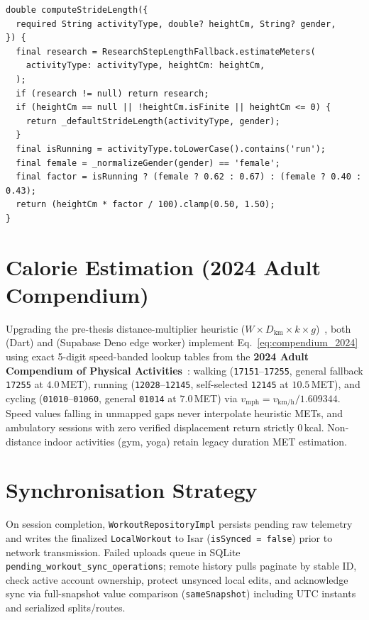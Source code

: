 \begin{lstlisting}[caption={Adaptive stride-length dispatch with height-based fallback in \texttt{record\_providers.dart}.},label={lst:stride_length}]
double computeStrideLength({
  required String activityType, double? heightCm, String? gender,
}) {
  final research = ResearchStepLengthFallback.estimateMeters(
    activityType: activityType, heightCm: heightCm,
  );
  if (research != null) return research;
  if (heightCm == null || !heightCm.isFinite || heightCm <= 0) {
    return _defaultStrideLength(activityType, gender);
  }
  final isRunning = activityType.toLowerCase().contains('run');
  final female = _normalizeGender(gender) == 'female';
  final factor = isRunning ? (female ? 0.62 : 0.67) : (female ? 0.40 : 0.43);
  return (heightCm * factor / 100).clamp(0.50, 1.50);
}
\end{lstlisting}

\section{Calorie Estimation (2024 Adult Compendium)}
Upgrading the pre-thesis distance-multiplier heuristic ($W \times D_{\text{km}} \times k \times g$)~\cite{aetron2026prethesis}, both  (Dart) and  (Supabase Deno edge worker) implement Eq.~\ref{eq:compendium_2024} using exact 5-digit speed-banded lookup tables from the \textbf{2024 Adult Compendium of Physical Activities}~\cite{herrmann2024compendium}: walking (\texttt{17151}--\texttt{17255}, general fallback \texttt{17255} at $4.0$\,MET), running (\texttt{12028}--\texttt{12145}, self-selected \texttt{12145} at $10.5$\,MET), and cycling (\texttt{01010}--\texttt{01060}, general \texttt{01014} at $7.0$\,MET) via $v_{\text{mph}} = v_{\text{km/h}}/1.609344$. Speed values falling in unmapped gaps never interpolate heuristic METs, and ambulatory sessions with zero verified displacement return strictly $0$\,kcal. Non-distance indoor activities (gym, yoga) retain legacy duration MET estimation.

\section{Synchronisation Strategy}
On session completion, \texttt{WorkoutRepositoryImpl} persists pending raw telemetry and writes the finalized \texttt{LocalWorkout} to Isar (\texttt{isSynced = false}) prior to network transmission. Failed uploads queue in SQLite \texttt{pending\_workout\_sync\_operations}; remote history pulls paginate by stable ID, check active account ownership, protect unsynced local edits, and acknowledge sync via full-snapshot value comparison (\texttt{sameSnapshot}) including UTC instants and serialized splits/routes.

